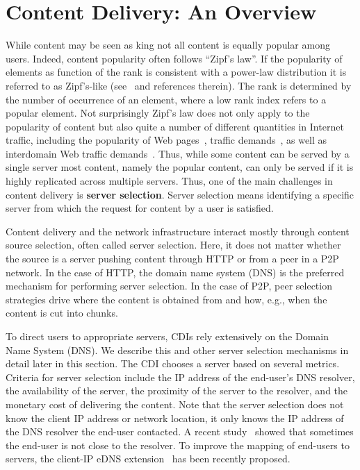 \section{Content Delivery: An Overview}\label{sec:overview}

While content may be seen as king not all content is equally popular among
users. Indeed, content popularity often follows ``Zipf's law''.  If the
popularity of elements as function of the rank is consistent with a power-law
distribution it is referred to as Zipf's-like (see~\cite{Zipf49,Mitzenmacher03}
and references therein).  The rank is determined by the number of occurrence of
an element, where a low rank index refers to a popular element.  Not
surprisingly Zipf's law does not only apply to the popularity of content but
also quite a number of different quantities in Internet traffic, including the
popularity of Web pages~\cite{breslau:99,SerpanosKarakostasWolf:00}, traffic
demands~\cite {Fang_Peterson:1999, feldmann:00,
ZhangBreslauPaxsonShenker2002,Wallerich:2005, BrownleeClaffy02}, as well as
interdomain Web traffic demands~\cite{Feldmann:Kammenhuber:2004}.  Thus, while
some content can be served by a single server most content, namely the popular
content, can only be served if it is highly replicated across multiple servers.
Thus, one of the main challenges in content delivery is {\bf{server
selection}}. Server selection means identifying a specific server from which
the request for content by a user is satisfied.

Content delivery and the network infrastructure interact mostly through content
source selection, often called server selection. Here, it does not matter
whether the source is a server pushing content through HTTP or from a peer in a
P2P network. In the case of HTTP, the domain name system (DNS) is the preferred
mechanism for performing server selection. In the case of P2P, peer selection
strategies drive where the content is obtained from and how, e.g., when the
content is cut into chunks.

To direct users to appropriate servers, CDIs rely extensively on the Domain
Name System (DNS).  We describe this and other server selection mechanisms in
detail later in this section.  The CDI chooses a server based on several
metrics. Criteria for server selection include the IP address of the end-user's
DNS resolver, the availability of the server, the proximity of the server to
the resolver, and the monetary cost of delivering the content. Note that the
server selection does not know the client IP address or network location, it
only knows the IP address of the DNS resolver the end-user contacted. A recent
study~\cite {DNS-IMC-2010} showed that sometimes the end-user is not close to
the resolver. To improve the mapping of end-users to servers, the client-IP
eDNS extension~\cite {DNS-extension-IP-client} has been recently proposed.

